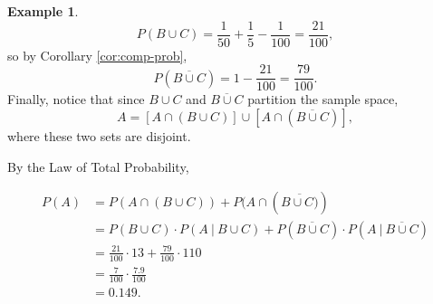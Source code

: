 \documentclass[
]{book}
\theoremstyle{definition}
\theoremstyle{definition}
\newtheorem{example}{Example}[chapter]
\theoremstyle{definition}
\theoremstyle{definition}
\theoremstyle{remark}
\begin{document}
\begin{example}
\[P(B \cup C) = \frac{1}{50} + \frac{1}{5} - \frac{1}{100} = \frac{21}{100},\] so by Corollary \ref{cor:comp-prob}, \[P(\overline{B \cup C}) = 1 - \frac{21}{100} = \frac{79}{100}.\]
Finally, notice that since \(B \cup C\) and \(\overline{B \cup C}\) partition the sample space, \[A = \left[A \cap (B \cup C)\right] \cup \left[A \cap (\overline{B \cup C})\right],\] where these two sets are disjoint.

By the Law of Total Probability,

\begin{align*}
P(A) &= P(A \cap (B \cup C)) + P(A \cap (\overline{B \cup C)})\\
     &= P(B \cup C) \cdot P(A ~|~ B \cup C) + P(\overline{B \cup C})\cdot P(A~|~\overline{B \cup C})\\
     &= \frac{21}{100} \cdot {1}{3} + \frac{79}{100}\cdot {1}{10} \\
     &= \frac{7}{100} \cdot \frac{7.9}{100} \\
     &= 0.149.
\end{align*}
\end{example}
\end{document}
